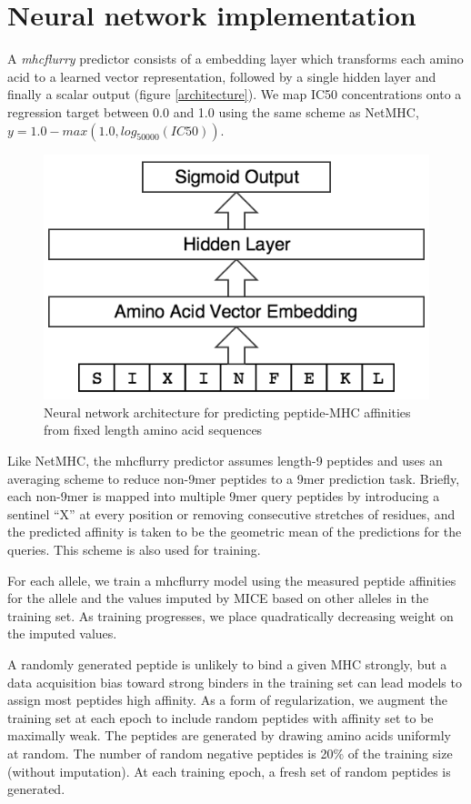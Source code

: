 \section{Neural network implementation}
A {\it mhcflurry} predictor consists of a embedding layer which transforms each amino acid to a learned vector representation, followed by a single hidden layer and finally a scalar output (figure \ref{architecture}). We map IC50 concentrations onto a regression target between 0.0 and 1.0 using the same scheme as NetMHC, $y = 1.0 - max(1.0, log_{50000}(IC50))$.

\begin{figure}[h]
\centering
\includegraphics[scale=0.25]{figures/mhcflurry-gliffy-network.png}
\caption{Neural network architecture for predicting peptide-MHC affinities from fixed length amino acid sequences}
\label{fig:architecture}
\end{figure}

Like NetMHC\cite{lundegaard2008accurate}, the mhcflurry predictor assumes length-9 peptides and uses an averaging scheme to reduce non-9mer peptides to a 9mer prediction task. Briefly, each non-9mer is mapped into multiple 9mer query peptides by introducing a sentinel ``X'' at every position or removing consecutive stretches of residues, and the predicted affinity is taken to be the geometric mean of the predictions for the queries. This scheme is also used for training.

For each allele, we train a mhcflurry model using the measured peptide affinities for the allele and the values imputed by MICE based on other alleles in the training set. As training progresses, we place quadratically decreasing weight on the imputed values.

A randomly generated peptide is unlikely to bind a given MHC strongly, but a data acquisition bias toward strong binders in the training set can lead models to assign most peptides high affinity. As a form of regularization, we augment the training set at each epoch to include random peptides with affinity set to be maximally weak. The peptides are generated by drawing amino acids uniformly at random. The number of random negative peptides is 20\% of the training size (without imputation). At each training epoch, a fresh set of random peptides is generated.

